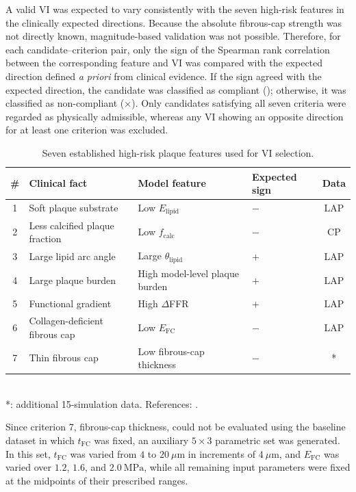 \documentclass[master,english,final]{kaist-ucs}
\begin{document}
A valid VI was expected to vary consistently with the seven high-risk features in the clinically expected directions. Because the absolute fibrous-cap strength was not directly known, magnitude-based validation was not possible. Therefore, for each candidate--criterion pair, only the sign of the Spearman rank correlation between the corresponding feature and VI was compared with the expected direction defined \emph{a priori} from clinical evidence. If the sign agreed with the expected direction, the candidate was classified as compliant (\checkmark); otherwise, it was classified as non-compliant ($\times$). Only candidates satisfying all seven criteria were regarded as physically admissible, whereas any VI showing an opposite direction for at least one criterion was excluded.

\begin{table}[ht]
\caption[Seven high-risk plaque features]{Seven established high-risk plaque features used for VI selection.}
\label{tab:seven-criteria}
\begin{center}
\begin{tabular}{clllc}
\hline\hline
\# & Clinical fact & Model feature & Expected sign & Data \\
\hline
1 & Soft plaque substrate & Low $E_\mathrm{lipid}$ & $-$ & LAP \\
2 & Less calcified plaque fraction & Low $f_\mathrm{calc}$ & $-$ & CP \\
3 & Large lipid arc angle & Large $\theta_\mathrm{lipid}$ & $+$ & LAP \\
4 & Large plaque burden & High model-level plaque burden & $+$ & LAP \\
5 & Functional gradient & High $\Delta$FFR & $+$ & LAP \\
6 & Collagen-deficient fibrous cap & Low $E_\mathrm{FC}$ & $-$ & LAP \\
7 & Thin fibrous cap & Low fibrous-cap thickness & $-$ & * \\
\hline\hline
\end{tabular}\\
*: additional 15-simulation data. References: \cite{motoyama2009, liu2025calc, prati2020clima, xing2017, williams2020lap, erlinge2021prospect2, takagi2022dffrct, lee2019emerald, sukhova1999, savvopoulos2024afm, stone2011prospect, naghavi2003vulnerable, virmani2006}.
\end{center}
\end{table}

Since criterion 7, fibrous-cap thickness, could not be evaluated using the baseline dataset in which $t_\mathrm{FC}$ was fixed, an auxiliary $5 \times 3$ parametric set was generated. In this set, $t_\mathrm{FC}$ was varied from $4$ to $20~\mu\mathrm{m}$ in increments of $4~\mu\mathrm{m}$, and $E_\mathrm{FC}$ was varied over $1.2$, $1.6$, and $2.0~\mathrm{MPa}$, while all remaining input parameters were fixed at the midpoints of their prescribed ranges.
\end{document}
